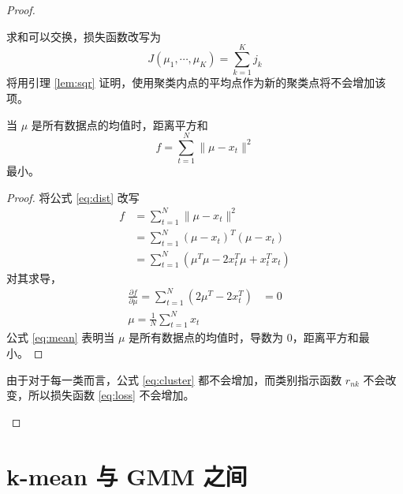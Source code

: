 \begin{proof}
\begin{enumerate}[(a)]
\begin{equation}
            \end{equation}
            求和可以交换，损失函数改写为
            \begin{equation}\label{eq:loss}
                J(\mu_1,\cdots,\mu_K)=\sum_{k=1}^K j_k
            \end{equation}
            将用引理 \ref{lem:sqr} 证明，使用聚类内点的平均点作为新的聚类点将不会增加该项。
            \begin{lemma}[距离平方和最小]\label{lem:sqr}
                当 $\mu$ 是所有数据点的均值时，距离平方和
                \begin{equation}\label{eq:dist}
                    f = \sum_{t=1}^N \| \mu-x_t \|^2
                \end{equation}
                最小。
                \begin{proof}
                    将公式 \eqref{eq:dist} 改写
                    \begin{align*}
                        f &= \sum_{t=1}^N \| \mu-x_t \|^2 \\
                          &= \sum_{t=1}^N (\mu-x_t)^T(\mu-x_t) \\
                          &= \sum_{t=1}^N \left(\mu^T\mu - 2x_t^T\mu+x_t^Tx_t\right)
                    \end{align*}
                    对其求导，
                    \begin{align}
                        \frac{\partial f}{\partial \mu} = \sum_{t=1}^N(2\mu^T-2x_t^T)&=0\nonumber\\
                        \mu=\frac{1}{N}\sum_{t=1}^N x_t\label{eq:mean}
                    \end{align}
                    公式 \eqref{eq:mean} 表明当 $\mu$ 是所有数据点的均值时，导数为 0，距离平方和最小。
                \end{proof}
            \end{lemma}
            由于对于每一类而言，公式 \eqref{eq:cluster} 都不会增加，而类别指示函数 $r_{nk}$ 不会改变，所以损失函数 \eqref{eq:loss} 不会增加。
        \end{enumerate}
    \end{proof}

    \section{k-mean 与 GMM 之间}



